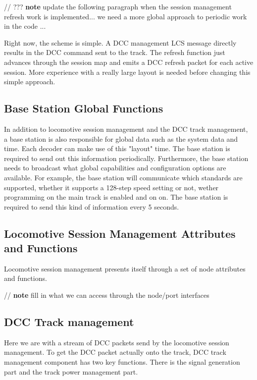 // ??? \textbf{note} update the following paragraph when the session management refresh work is implemented... we need a more global approach to periodic work in the code ...

Right now, the scheme is simple. A DCC management LCS message directly results in the DCC command sent to the track. The refresh function just advances through the session map and emits a DCC refresh packet for each active session. More experience with a really large layout is needed before changing this simple approach.

\subsection{Base Station Global Functions}

In addition to locomotive session management and the DCC track management, a base station is also responsible for global data such as the system data and time. Each decoder can make use of this "layout" time. The base station is required to send out this information periodically. Furthermore, the base station needs to broadcast what global capabilities and configuration options are available. For example, the base station will communicate which standards are supported, whether it supports a 128-step speed setting or not, wether  programming on the main track is enabled and on on. The base station is required to send this kind of information every 5 seconds.

\subsection{Locomotive Session Management Attributes and Functions}

Locomotive session management presents itself through a set of node attributes and functions.

// \textbf{note} fill in what we can access through the node/port interfaces


\subsection{DCC Track management}

Here we are with a stream of DCC packets send by the locomotive session management. To get the DCC packet actually onto the track, DCC track management component has two key functions. There is the signal generation part and the track power management part.

